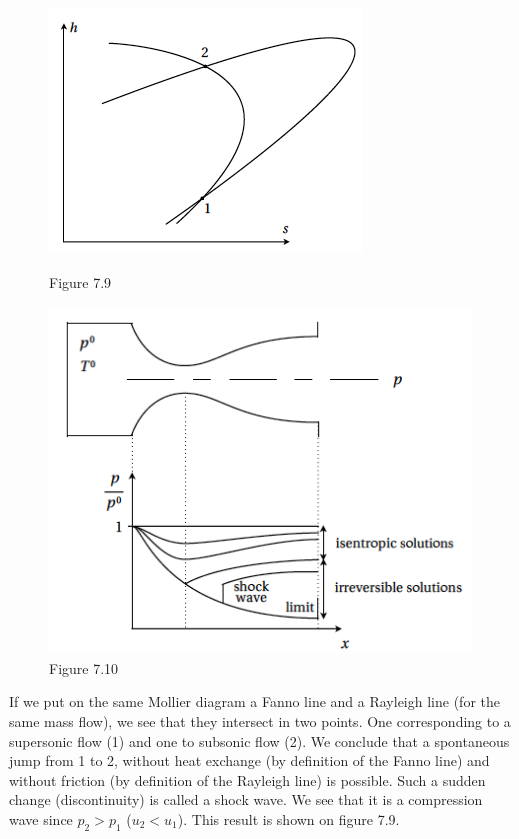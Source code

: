 \begin{figure}[H]
\centering
\begin{minipage}{.5\textwidth}
  \centering
  \includegraphics[scale=0.40]{ch7/chap791.png}
  \caption*{Figure 7.9}
  \label{fig:test1}
\end{minipage}%
\begin{minipage}{.5\textwidth}
  \centering
  \includegraphics[scale=0.40]{ch7/chap792.png}
  \caption*{Figure 7.10}
  \label{fig:test2}
\end{minipage}
\end{figure}

If we put on the same Mollier diagram a Fanno line and a Rayleigh line (for the same mass flow), we see that they intersect in two points. One corresponding to a supersonic flow (1) and one to subsonic flow (2). We conclude that a spontaneous jump from 1 to 2, without heat exchange (by definition of the Fanno line) and without friction (by definition of the Rayleigh line) is possible. Such a sudden change (discontinuity) is called a shock wave. We see that it is a compression wave since $p_2>p_1$ ($u_2<u_1$). This result is shown on figure 7.9.
\\

